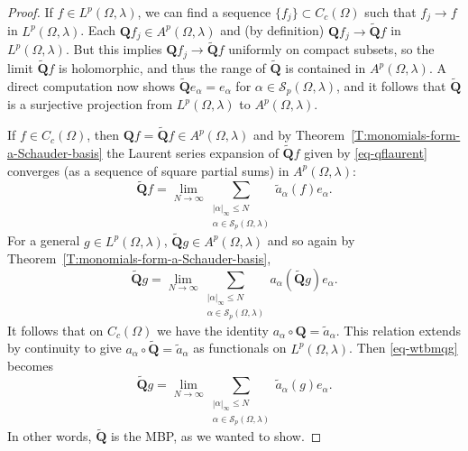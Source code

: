 \documentclass[10pt,a4paper]{amsart}
\newcommand{\abs}[1]{\left\vert#1\right\vert}
\newcommand{\cs}{{\mathcal S}}
\newcommand{\wt}{\widetilde}
\begin{document}
\begin{proof}
If $f\in L^p(\Omega, \lambda)$, we can find a sequence $\{f_j\}\subset C_c(\Omega)$ such that $f_j\to f$ in $L^p(\Omega,\lambda)$. 
Each $\bm{Q}f_j \in A^p(\Omega, \lambda)$ and (by definition) $\bm{Q}f_j\to \wt{\bm{Q}}f$ in  $L^p(\Omega, \lambda)$. 
But this implies $\bm{Q}f_j\to \wt{\bm{Q}}f$ uniformly on compact subsets, so the limit  $\wt{\bm{Q}}f$ is holomorphic, and thus the range of $\wt{\bm{Q}}$ is contained in $A^p(\Omega, \lambda)$. 
A direct computation now shows $\wt{\bm{Q}}e_\alpha = e_\alpha$ for $\alpha \in \cs_p(\Omega,\lambda)$, and it follows that $\wt{\bm{Q}}$ is a surjective projection from $L^p(\Omega,\lambda)$ to $A^p(\Omega, \lambda)$. 

If $f\in C_c(\Omega) $, then ${\bm{Q}}f = \wt{\bm{Q}}f \in A^p(\Omega, \lambda)$ and by Theorem~\ref{T:monomials-form-a-Schauder-basis} the Laurent series expansion of $\wt{\bm{Q}}f$ given by \eqref{eq-qflaurent} converges (as a sequence of square partial sums) in $A^p(\Omega,\lambda)$:
\begin{equation}\label{eq-qrearrange}
\wt{\bm{Q}}f = \lim_{N\to \infty} \sum_{\substack{\abs{\alpha}_\infty\leq N\\\alpha\in \cs_p(\Omega,\lambda) }}\wt{a}_\alpha(f) e_\alpha. 
\end{equation}
For a general $g \in L^p(\Omega, \lambda)$, $\wt{\bm{Q}}g \in A^p(\Omega,\lambda)$ and so again by Theorem~\ref{T:monomials-form-a-Schauder-basis},
\begin{equation}\label{eq-wtbmqg} 
\wt{\bm{Q}}g = \lim_{N\to \infty} \sum_{\substack{\abs{\alpha}_\infty\leq N\\\alpha\in \cs_p(\Omega,\lambda)}} {a}_\alpha(\wt{\bm{Q}}g) e_\alpha.
\end{equation} 
It follows that on $C_c(\Omega)$ we have the identity $a_\alpha\circ{\bm{Q}}= \wt{a}_\alpha$. 
This relation extends by continuity to give  $a_\alpha\circ{\wt{\bm{Q}}}= \wt{a}_\alpha$ as functionals on $L^p(\Omega, \lambda)$. 
Then \eqref{eq-wtbmqg} becomes
\[
\wt{\bm{Q}}g = \lim_{N\to \infty} \sum_{\substack{\abs{\alpha}_\infty\leq N\\\alpha\in \cs_p(\Omega,\lambda) }}\wt{a}_\alpha(g) e_\alpha.
\]
In other words, $\wt{\bm{Q}}$ is the MBP, as we wanted to show. 
\end{proof}
\end{document}
